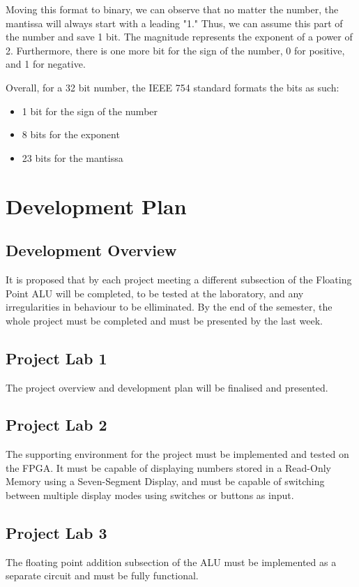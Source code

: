 \documentclass[a4paper,10pt]{article}
\begin{document}
    Moving this format to binary, we can observe that no matter the number, the mantissa will always start with a leading "1." Thus, we can assume this part of the number and save 1 bit. The magnitude represents the exponent of a power of 2. Furthermore, there is one more bit for the sign of the number, 0 for positive, and 1 for negative.

    Overall, for a 32 bit number, the IEEE 754 standard formats the bits as such:
    \begin{itemize}
     \item 1 bit for the sign of the number
     \item 8 bits for the exponent
     \item 23 bits for the mantissa
    \end{itemize}

    \newpage
    \section{Development Plan}
    \subsection{Development Overview}
    It is proposed that by each project meeting a different subsection of the Floating Point ALU will be completed, to be tested at the laboratory, and any irregularities in behaviour to be elliminated. By the end of the semester, the whole project must be completed and must be presented by the last week.

    \subsection{Project Lab 1}
    The project overview and development plan will be finalised and presented.

    \subsection{Project Lab 2}
    The supporting environment for the project must be implemented and tested on the FPGA. It must be capable of displaying numbers stored in a Read-Only Memory using a Seven-Segment Display, and must be capable of switching between multiple display modes using switches or buttons as input.

    \subsection{Project Lab 3}
    The floating point addition subsection of the ALU must be implemented as a separate circuit and must be fully functional.
\end{document}
